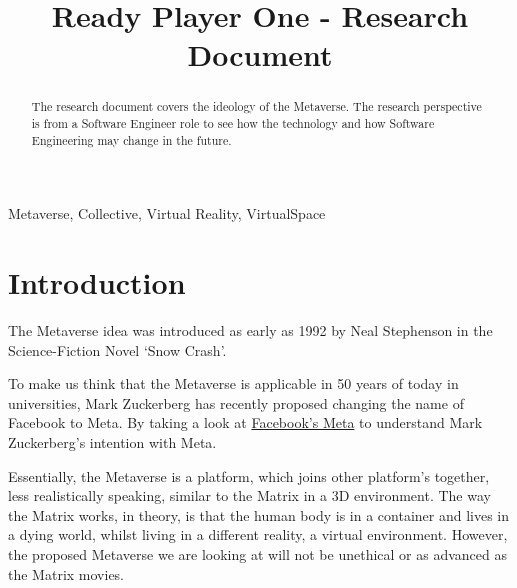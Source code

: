 \documentclass[conference]{IEEEtran}
\begin{document}
	\title{Ready Player One - Research Document}

	\author{
	}

     \maketitle
    
    \thispagestyle{plain}
    \pagestyle{plain}
    
    \tableofcontents
	  \vspace{.5cm}
    \begin{abstract}
      The research document covers the ideology of the Metaverse. The research perspective is from a Software Engineer role to see how the technology and how Software Engineering may change in the future.
    \end{abstract}

    \begin{IEEEkeywords}
      Metaverse, Collective, Virtual Reality, VirtualSpace
    \end{IEEEkeywords}

    \section{Introduction}
      The Metaverse idea was introduced as early as 1992 by Neal Stephenson in the Science-Fiction Novel `Snow Crash'.

      To make us think that the Metaverse is applicable in 50 years of today in universities, Mark Zuckerberg has recently proposed changing the name of Facebook to Meta. By taking a look at \href{https://about.facebook.com/meta?utm_source=Google&utm_medium=paid-search&utm_campaign=metaverse&utm_content=post-launch}{Facebook's Meta} to understand Mark Zuckerberg's intention with Meta.
      
      Essentially, the Metaverse is a platform, which joins other platform's together, less realistically speaking, similar to the Matrix in a 3D environment. The way the Matrix works, in theory, is that the human body is in a container and lives in a dying world, whilst living in a different reality, a virtual environment. However, the proposed Metaverse we are looking at will not be unethical or as advanced as the Matrix movies.
      
\end{document}
